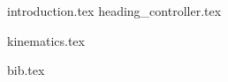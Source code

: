 \documentclass{article}
\begin{document}
{introduction.tex}
{heading_controller.tex}

{kinematics.tex}








\newpage
{bib.tex}
\end{document}
